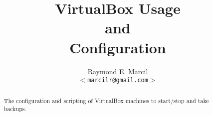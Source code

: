 \documentclass[12pt,letterpaper,dvips]{article}
\title{VirtualBox Usage\\
  and\\
  Configuration}
\author{Raymond E. Marcil\\
        \texttt{$<$marcilr@gmail.com$>$}
}
\newenvironment{itemize*}%
  {\begin{itemize}%
    \setlength{\itemsep}{0pt}%
    \setlength{\parsep}{0pt}}%
  {\end{itemize}}
\begin{document}
\maketitle

\begin{abstract}
  The configuration and scripting of VirtualBox
  machines to start/stop and take backups.
\end{abstract}

\vspace{2.0in}


\newpage
\tableofcontents

\newpage
\listoffigures
\listoftables








\end{document}
